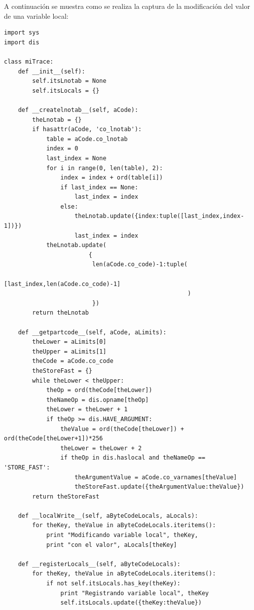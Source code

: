 \documentclass[12pt,legalpaper]{report}
\begin{document}
A continuación se muestra como se realiza la captura de la modificación del valor de una variable local:

\begin{singlespace}
\begin{lstlisting}[style=Python]
import sys
import dis

class miTrace:
    def __init__(self):
        self.itsLnotab = None
        self.itsLocals = {}

    def __createlnotab__(self, aCode):
        theLnotab = {}
        if hasattr(aCode, 'co_lnotab'):
            table = aCode.co_lnotab
            index = 0
            last_index = None
            for i in range(0, len(table), 2):
                index = index + ord(table[i])
                if last_index == None:
                    last_index = index
                else:
                    theLnotab.update({index:tuple([last_index,index-1])})                
                    last_index = index
            theLnotab.update(
                        {
                         len(aCode.co_code)-1:tuple(
                                            [last_index,len(aCode.co_code)-1]
                                                    )
                         })                
        return theLnotab 
    
    def __getpartcode__(self, aCode, aLimits):
        theLower = aLimits[0]
        theUpper = aLimits[1]
        theCode = aCode.co_code
        theStoreFast = {}    
        while theLower < theUpper:
            theOp = ord(theCode[theLower])
            theNameOp = dis.opname[theOp]
            theLower = theLower + 1
            if theOp >= dis.HAVE_ARGUMENT:
                theValue = ord(theCode[theLower]) + ord(theCode[theLower+1])*256
                theLower = theLower + 2
                if theOp in dis.haslocal and theNameOp == 'STORE_FAST':
                    theArgumentValue = aCode.co_varnames[theValue]
                    theStoreFast.update({theArgumentValue:theValue})
        return theStoreFast
    
    def __localWrite__(self, aByteCodeLocals, aLocals):
        for theKey, theValue in aByteCodeLocals.iteritems():
            print "Modificando variable local", theKey,
            print "con el valor", aLocals[theKey]

    def __registerLocals__(self, aByteCodeLocals):
        for theKey, theValue in aByteCodeLocals.iteritems():
            if not self.itsLocals.has_key(theKey):
                print "Registrando variable local", theKey
                self.itsLocals.update({theKey:theValue})


\end{lstlisting}
\end{singlespace}
\end{document}

